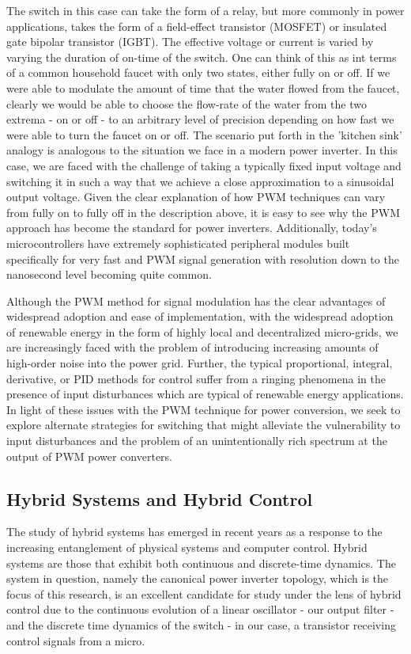 The switch in this case can take the form of a relay, but more commonly in power applications, takes the form of a field-effect transistor (MOSFET) or insulated gate bipolar transistor (IGBT). The effective voltage or current is varied by varying the duration of on-time of the switch. One can think of this as int terms of a common household faucet with only two states, either fully on or off. If we were able to modulate the amount of time that the water flowed from the faucet, clearly we would be able to choose the flow-rate of the water from the two extrema - on or off - to an arbitrary level of precision depending on how fast we were able to turn the faucet on or off. The scenario put forth in the 'kitchen sink' analogy is analogous to the situation we face in a modern power inverter. In this case, we are faced with the challenge of taking a typically fixed input voltage and switching it in such a way that we achieve a close approximation to a sinusoidal output voltage. Given the clear explanation of how PWM techniques can vary from fully on to fully off in the description above, it is easy to see why the PWM approach has become the standard for power inverters. Additionally, today's microcontrollers have extremely sophisticated peripheral modules built specifically for very fast and PWM signal generation with resolution down to the nanosecond level becoming quite common. 

Although the PWM method for signal modulation has the clear advantages of widespread adoption and ease of implementation, with the widespread adoption of renewable energy in the form of highly local and decentralized micro-grids, we are increasingly faced with the problem of introducing increasing amounts of high-order noise into the power grid. Further, the typical proportional, integral, derivative, or PID methods for control suffer from a ringing phenomena in the presence of input disturbances which are typical of renewable energy applications. In light of these issues with the PWM technique for power conversion, we seek to explore alternate strategies for switching that might alleviate the vulnerability to  input disturbances and the problem of an unintentionally rich spectrum at the output of PWM power converters. 

\subsection{Hybrid Systems and Hybrid Control}
The study of hybrid systems has emerged in recent years as a response to the increasing entanglement of physical systems and computer control. 
Hybrid systems are those that exhibit both continuous and discrete-time dynamics. The system in question, namely the canonical power inverter topology, which is the focus of this research, is an excellent candidate for study under the lens of hybrid control due to the continuous evolution of a linear oscillator - our output filter - and the discrete time dynamics of the switch - in our case, a transistor receiving control signals from a micro. 

